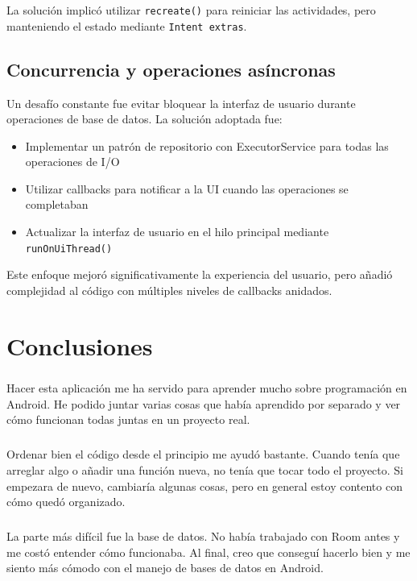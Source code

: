 \documentclass[a4paper,12pt]{report}
\begin{document}
      La solución implicó utilizar \texttt{recreate()} para reiniciar las actividades, pero manteniendo el estado mediante \texttt{Intent extras}.
      
    \section{Concurrencia y operaciones asíncronas}
      Un desafío constante fue evitar bloquear la interfaz de usuario durante operaciones de base de datos. La solución adoptada fue:
      \begin{itemize}
          \item Implementar un patrón de repositorio con ExecutorService para todas las operaciones de I/O
          \item Utilizar callbacks para notificar a la UI cuando las operaciones se completaban
          \item Actualizar la interfaz de usuario en el hilo principal mediante \texttt{runOnUiThread()}
      \end{itemize}

      Este enfoque mejoró significativamente la experiencia del usuario, pero añadió complejidad al código con múltiples niveles de callbacks anidados.

  \chapter{Conclusiones}
    \paragraph*{}{Hacer esta aplicación me ha servido para aprender mucho sobre programación en Android. He podido juntar varias cosas que había aprendido por separado y ver cómo funcionan todas juntas en un proyecto real.}
    \paragraph*{}{Ordenar bien el código desde el principio me ayudó bastante. Cuando tenía que arreglar algo o añadir una función nueva, no tenía que tocar todo el proyecto. Si empezara de nuevo, cambiaría algunas cosas, pero en general estoy contento con cómo quedó organizado.}
    \paragraph*{}{La parte más difícil fue la base de datos. No había trabajado con Room antes y me costó entender cómo funcionaba. Al final, creo que conseguí hacerlo bien y me siento más cómodo con el manejo de bases de datos en Android.}
\end{document}
